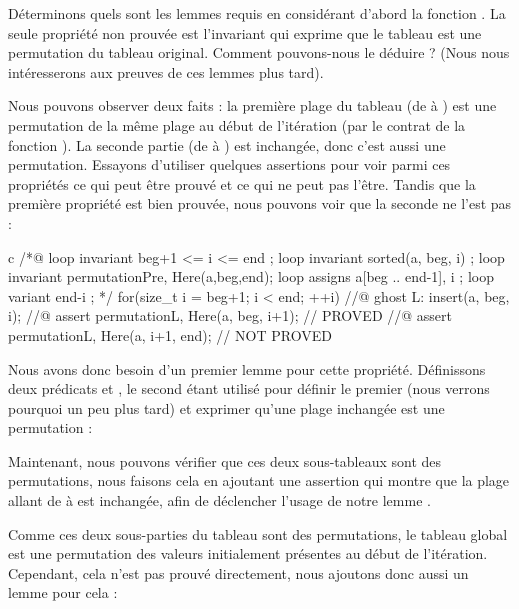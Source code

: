 Déterminons quels sont les lemmes requis en considérant d'abord la fonction
. La seule propriété non prouvée est l'invariant qui
exprime que le tableau est une permutation du tableau original. Comment
pouvons-nous le déduire ? (Nous nous intéresserons aux preuves de ces lemmes
plus tard).



Nous pouvons observer deux faits : la première plage du tableau (de
 à ) est une permutation de la même plage au
début de l'itération (par le contrat de la fonction ). La
seconde partie (de  à ) est inchangée, donc
c'est aussi une permutation. Essayons d'utiliser quelques assertions pour voir
parmi ces propriétés ce qui peut être prouvé et ce qui ne peut pas l'être.
Tandis que la première propriété est bien prouvée, nous pouvons voir que la
seconde ne l'est pas :



\begin{CodeBlock}{c}
  /*@
    loop invariant beg+1 <= i <= end ;
    loop invariant sorted(a, beg, i) ;
    loop invariant permutation{Pre, Here}(a,beg,end);
    loop assigns a[beg .. end-1], i ;
    loop variant end-i ;
  */
  for(size_t i = beg+1; i < end; ++i) {
    //@ ghost L:
    insert(a, beg, i);
    //@ assert permutation{L, Here}(a, beg, i+1); // PROVED
    //@ assert permutation{L, Here}(a, i+1, end); // NOT PROVED
  }
\end{CodeBlock}


Nous avons donc besoin d'un premier lemme pour cette propriété. Définissons
deux prédicats  et , le second
étant utilisé pour définir le premier (nous verrons pourquoi un peu plus
tard) et exprimer qu'une plage inchangée est une permutation :





Maintenant, nous pouvons vérifier que ces deux sous-tableaux sont des
permutations, nous faisons cela en ajoutant une assertion qui montre que la
plage allant de  à  est inchangée, afin de
déclencher l'usage de notre lemme .




Comme ces deux sous-parties du tableau sont des permutations, le tableau
global est une permutation des valeurs initialement présentes au début de
l'itération. Cependant, cela n'est pas prouvé directement, nous ajoutons
donc aussi un lemme pour cela :


